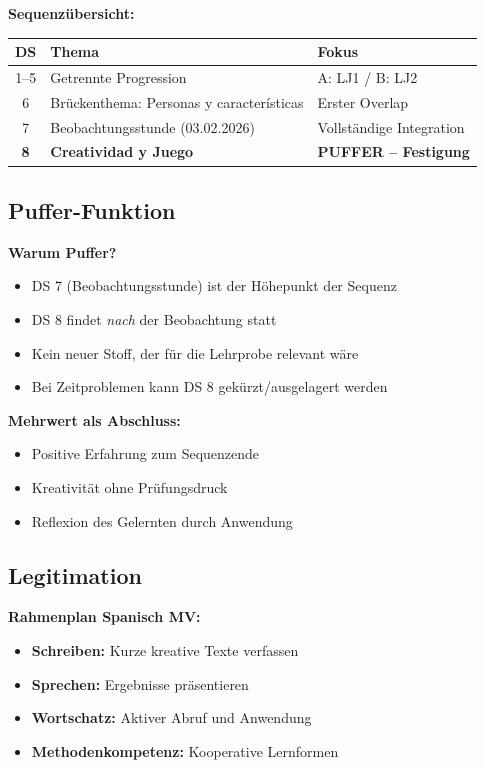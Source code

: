 \documentclass[11pt,a4paper]{article}
\begin{document}
\vspace{0.5em}
\textbf{Sequenzübersicht:}
\begin{center}
\begin{tabular}{|c|l|l|}
\hline
\textbf{DS} & \textbf{Thema} & \textbf{Fokus} \\
\hline
1--5 & Getrennte Progression & A: LJ1 / B: LJ2 \\
\hline
6 & Brückenthema: Personas y características & Erster Overlap \\
\hline
7 & Beobachtungsstunde (03.02.2026) & Vollständige Integration \\
\hline
\rowcolor{lightgray} \textbf{8} & \textbf{Creatividad y Juego} & \textbf{PUFFER -- Festigung} \\
\hline
\end{tabular}
\end{center}

\subsection{Puffer-Funktion}

\textbf{Warum Puffer?}
\begin{itemize}
    \item DS 7 (Beobachtungsstunde) ist der Höhepunkt der Sequenz
    \item DS 8 findet \textit{nach} der Beobachtung statt
    \item Kein neuer Stoff, der für die Lehrprobe relevant wäre
    \item Bei Zeitproblemen kann DS 8 gekürzt/ausgelagert werden
\end{itemize}

\textbf{Mehrwert als Abschluss:}
\begin{itemize}
    \item Positive Erfahrung zum Sequenzende
    \item Kreativität ohne Prüfungsdruck
    \item Reflexion des Gelernten durch Anwendung
\end{itemize}

\subsection{Legitimation}

\textbf{Rahmenplan Spanisch MV:}
\begin{itemize}
    \item \textbf{Schreiben:} Kurze kreative Texte verfassen
    \item \textbf{Sprechen:} Ergebnisse präsentieren
    \item \textbf{Wortschatz:} Aktiver Abruf und Anwendung
    \item \textbf{Methodenkompetenz:} Kooperative Lernformen
\end{itemize}
\end{document}
